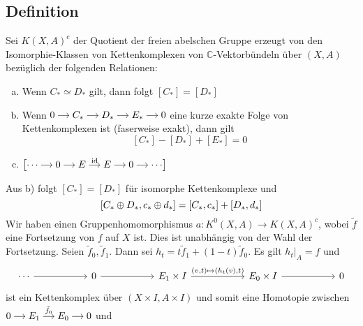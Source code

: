 \subsection*{Definition}
Sei $K(X,A)^c$ der Quotient der freien abelschen Gruppe erzeugt von den Isomorphie-Klassen von Kettenkomplexen von $\mathds{C}$-Vektorbündeln über $(X,A)$ bezüglich der 
folgenden Relationen:
\begin{enumerate}[a)]
	\item Wenn $C_* \simeq D_*$ gilt, dann folgt $[C_*] = [D_*]$
	\item Wenn $\begin{tikzcd}[cramped,sep=small]
		0 \rar & C_* \rar & D_* \rar & E_* \rar & 0
	\end{tikzcd}$ eine kurze exakte Folge von Kettenkomplexen ist (faserweise exakt), dann gilt
	\[
		[C_*] - [D_*] + [E_*] = 0
	\]
	\item \(
		\big[ \begin{tikzcd}[cramped,sep=small]
			\cdots \rar & 0 \rar & E \rar["\id"] & E \rar & 0 \rar & \cdots
		\end{tikzcd}\big]
	\) 
\end{enumerate}
Aus b) folgt $[C_*] = [D_*]$ für isomorphe Kettenkomplexe und 
\[
	\benbrace*{C_* \oplus  D_*, c_* \oplus d_*} = [C_*,c_*] + [D_*,d_*] 
\]
Wir haben einen Gruppenhomomorphismus $a \colon K^0(X,A) \to K(X,A)^c$, 
wobei $\tilde{f}$ eine Fortsetzung von $f$ auf $X$ ist. Dies ist unabhängig von der Wahl der Fortsetzung. Seien $\tilde{f}_0, \tilde{f}_1$. Dann sei 
$h_t = t \tilde{f}_1 + (1-t) \tilde{f}_0$. Es gilt $h_t|_A =f$ und 
\[
	\begin{tikzcd}[sep=5.5em]
		\cdots \rar & 0  \rar & E_1 \times I \rar["{(v,t) \mapsto (h_t(v),t)}"] & E_0 \times I \rar & 0
	\end{tikzcd}
\]
ist ein Kettenkomplex über $(X \times I, A \times I)$ und somit eine Homotopie zwischen 
$\begin{tikzcd}[cramped,sep=small]0 \rar & E_1 \rar["\tilde{f}_0"] & E_0 \rar & 0\end{tikzcd}$ und 

